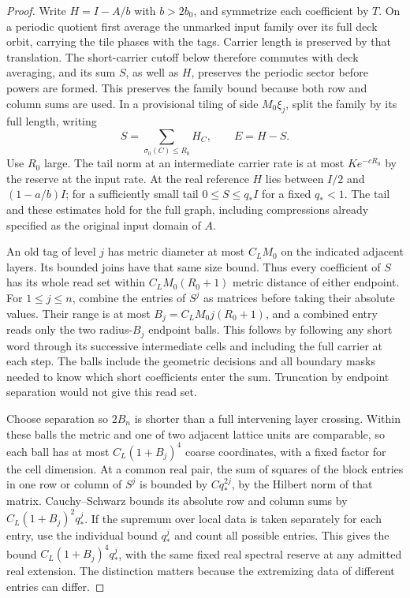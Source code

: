\documentclass[11pt,letterpaper,reqno]{amsart}
\numberwithin{equation}{section}
\theoremstyle{definition}
\theoremstyle{remark}
\begin{document}
\begin{proof}
Write \(H=I-A/b\) with \(b>2b_0\), and symmetrize each coefficient by \(T\). On a periodic quotient first average the unmarked input family over its full deck orbit, carrying the tile phases with the tags. Carrier length is preserved by that translation. The short-carrier cutoff below therefore commutes with deck averaging, and its sum \(S\), as well as \(H\), preserves the periodic sector before powers are formed. This preserves the family bound because both row and column sums are used. In a provisional tiling of side \(M_0\xi_j\), split the family by its full length, writing
\[
 S=\sum_{\sigma_0(C)\le R_0} H_C,\qquad E=H-S.
\]
Use \(R_0\) large. The tail norm at an intermediate carrier rate is at most \(K e^{-cR_0}\) by the reserve at the input rate. At the real reference \(H\) lies between \(I/2\) and \((1-a/b)I\); for a sufficiently small tail \(0\le S\le q_* I\) for a fixed \(q_*<1\). The tail and these estimates hold for the full graph, including compressions already specified as the original input domain of \(A\).

An old tag of level \(j\) has metric diameter at most \(C_L M_0\) on the indicated adjacent layers. Its bounded joins have that same size bound. Thus every coefficient of \(S\) has its whole read set within \(C_L M_0(R_0+1)\) metric distance of either endpoint. For \(1\le j\le n\), combine the entries of \(S^j\) as matrices before taking their absolute values. Their range is at most \(B_j=C_LM_0j(R_0+1)\), and a combined entry reads only the two radius-\(B_j\) endpoint balls. This follows by following any short word through its successive intermediate cells and including the full carrier at each step. The balls include the geometric decisions and all boundary masks needed to know which short coefficients enter the sum. Truncation by endpoint separation would not give this read set.

Choose separation so \(2B_n\) is shorter than a full intervening layer crossing. Within these balls the metric and one of two adjacent lattice units are comparable, so each ball has at most \(C_L(1+B_j)^4\) coarse coordinates, with a fixed factor for the cell dimension. At a common real pair, the sum of squares of the block entries in one row or column of \(S^j\) is bounded by \(Cq_*^{2j}\), by the Hilbert norm of that matrix. Cauchy--Schwarz bounds its absolute row and column sums by \(C_L(1+B_j)^2q_*^j\). If the supremum over local data is taken separately for each entry, use the individual bound \(q_*^j\) and count all possible entries. This gives the bound \(C_L(1+B_j)^4q_*^j\), with the same fixed real spectral reserve at any admitted real extension. The distinction matters because the extremizing data of different entries can differ.


\end{proof}
\end{document}
